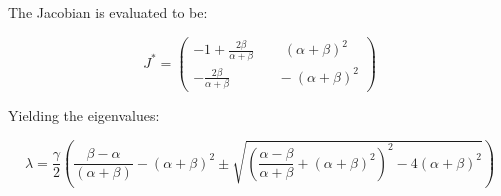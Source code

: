 \documentclass{beamer}
\begin{document}
            \begin{frame}{\insertsubsectionhead}
            
                \vfill
                
                The Jacobian is evaluated to be:
                
                \vfill
                
                $$ J^* =  \left(
                \begin{aligned}
                    -1+\frac{2\beta}{\alpha+\beta} ~~&~~~~ (\alpha+\beta)^2 \\
                    -\frac{2\beta}{\alpha+\beta} ~~~~&~~ -(\alpha+\beta)^2
                \end{aligned} \right)$$
                
                \vfill
                
                Yielding the eigenvalues:
                
                \vfill
                
                \begin{equation*}
                    \lambda = \frac{\gamma}{2}\left( \frac{\beta-\alpha}{(\alpha+\beta)}-(\alpha+\beta)^2\pm\sqrt{\left(\frac{\alpha-\beta}{\alpha+\beta}+(\alpha+\beta)^2\right)^2-4(\alpha+\beta)^2}\right)
                \end{equation*} 
                
                \vfill
            
            \end{frame}
        
            \begin{frame}{\insertsubsectionhead}
            
                \vspace{-5mm}
                \begin{figure}[H]
                    \centering
                \end{figure}

            \end{frame}
            
\end{document}
